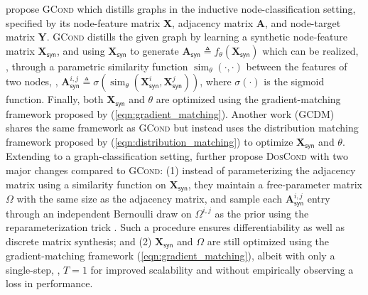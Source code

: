 \documentclass[10pt]{article} %
\begin{document}
\citet{graph_distill_iclr_22} propose \textsc{GCond} which distills graphs in the inductive node-classification setting, specified by its node-feature matrix $\mathbf{X}$, adjacency matrix $\mathbf{A}$, and node-target matrix $\mathbf{Y}$. \textsc{GCond} distills the given graph by learning a synthetic node-feature matrix $\mathbf{X}_{\mathsf{syn}}$, and using $\mathbf{X}_{\mathsf{syn}}$ to generate $\mathbf{A}_{\mathsf{syn}} \triangleq f_\theta(\mathbf{X}_{\mathsf{syn}})$ which can be realized, \eg, through a parametric similarity function $\operatorname{sim}_\theta(\cdot, \cdot)$ between the features of two nodes, \ie, $\mathbf{A}_{\mathsf{syn}}^{i, j} \triangleq \sigma(\operatorname{sim}_\theta(\mathbf{X}_{\mathsf{syn}}^{i}, \mathbf{X}_{\mathsf{syn}}^{j}))$, where $\sigma(\cdot)$ is the sigmoid function. Finally, both $\mathbf{X}_{\mathsf{syn}}$ and $\theta$ are optimized using the gradient-matching framework proposed by \citet{zhao_dc} (\cref{eqn:gradient_matching}). Another work \citep{graph_distill_arxiv} (GCDM) shares the same framework as \textsc{GCond} but instead uses the distribution matching framework proposed by \citet{dm} (\cref{eqn:distribution_matching}) to optimize $\mathbf{X}_{\mathsf{syn}}$ and $\theta$. Extending to a graph-classification setting, \citet{graph_distill_kdd_22} further propose \textsc{DosCond} with two major changes compared to \textsc{GCond}: (1) instead of parameterizing the adjacency matrix using a similarity function on $\mathbf{X}_{\mathsf{syn}}$, they maintain a free-parameter matrix $\Omega$ with the same size as the adjacency matrix, and sample each $\mathbf{A}_{\mathsf{syn}}^{i, j}$ entry through an independent Bernoulli draw on $\Omega^{i, j}$ as the prior using the reparameterization trick \citep{reparameter}. Such a procedure ensures differentiability as well as discrete matrix synthesis; and (2) $\mathbf{X}_{\mathsf{syn}}$ and $\Omega$ are still optimized using the gradient-matching framework (\cref{eqn:gradient_matching}), albeit with only a single-step, \ie, $T=1$ for improved scalability and without empirically observing a loss in performance.
\end{document}
